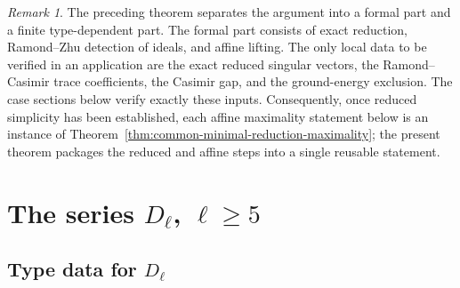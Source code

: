 \documentclass[11pt,reqno]{amsart}
\theoremstyle{definition}
\theoremstyle{remark}
\newtheorem{remark}[theorem]{Remark}
\begin{document}
\begin{remark}

The preceding theorem separates the argument into a formal part and a
finite type-dependent part.  The formal part consists of exact reduction,
Ramond--Zhu detection of ideals, and affine lifting.  The only local data to
be verified in an application are the exact reduced singular vectors, the
Ramond--Casimir trace coefficients, the Casimir gap, and the ground-energy
exclusion.  The case sections below verify exactly these inputs.  Consequently, once
reduced simplicity has been established, each affine maximality statement
below is an instance of
Theorem~\ref{thm:common-minimal-reduction-maximality}; the present theorem
packages the reduced and affine steps into a single reusable statement.
\end{remark}
\section{The series \texorpdfstring{$D_\ell$}{D-l}, \texorpdfstring{$\ell\ge5$}{l>=5}}
\label{sec:case-dl}


\subsection{Type data for \texorpdfstring{$D_\ell$}{D-l}}
\label{dl:sec:Dl-preliminaries}
\end{document}
